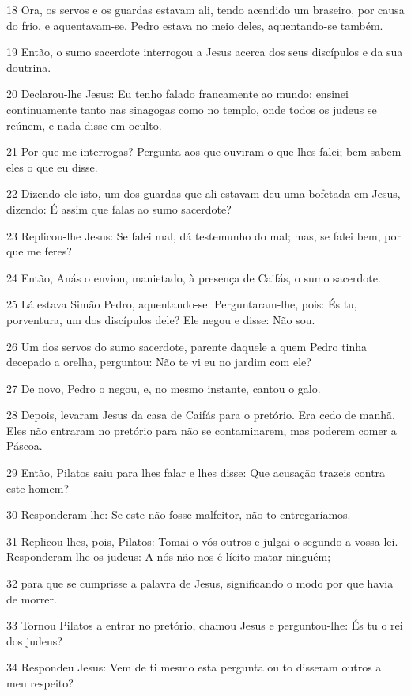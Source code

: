 \par 18 Ora, os servos e os guardas estavam ali, tendo acendido um braseiro, por causa do frio, e aquentavam-se. Pedro estava no meio deles, aquentando-se também.
\par 19 Então, o sumo sacerdote interrogou a Jesus acerca dos seus discípulos e da sua doutrina.
\par 20 Declarou-lhe Jesus: Eu tenho falado francamente ao mundo; ensinei continuamente tanto nas sinagogas como no templo, onde todos os judeus se reúnem, e nada disse em oculto.
\par 21 Por que me interrogas? Pergunta aos que ouviram o que lhes falei; bem sabem eles o que eu disse.
\par 22 Dizendo ele isto, um dos guardas que ali estavam deu uma bofetada em Jesus, dizendo: É assim que falas ao sumo sacerdote?
\par 23 Replicou-lhe Jesus: Se falei mal, dá testemunho do mal; mas, se falei bem, por que me feres?
\par 24 Então, Anás o enviou, manietado, à presença de Caifás, o sumo sacerdote.
\par 25 Lá estava Simão Pedro, aquentando-se. Perguntaram-lhe, pois: És tu, porventura, um dos discípulos dele? Ele negou e disse: Não sou.
\par 26 Um dos servos do sumo sacerdote, parente daquele a quem Pedro tinha decepado a orelha, perguntou: Não te vi eu no jardim com ele?
\par 27 De novo, Pedro o negou, e, no mesmo instante, cantou o galo.
\par 28 Depois, levaram Jesus da casa de Caifás para o pretório. Era cedo de manhã. Eles não entraram no pretório para não se contaminarem, mas poderem comer a Páscoa.
\par 29 Então, Pilatos saiu para lhes falar e lhes disse: Que acusação trazeis contra este homem?
\par 30 Responderam-lhe: Se este não fosse malfeitor, não to entregaríamos.
\par 31 Replicou-lhes, pois, Pilatos: Tomai-o vós outros e julgai-o segundo a vossa lei. Responderam-lhe os judeus: A nós não nos é lícito matar ninguém;
\par 32 para que se cumprisse a palavra de Jesus, significando o modo por que havia de morrer.
\par 33 Tornou Pilatos a entrar no pretório, chamou Jesus e perguntou-lhe: És tu o rei dos judeus?
\par 34 Respondeu Jesus: Vem de ti mesmo esta pergunta ou to disseram outros a meu respeito?
